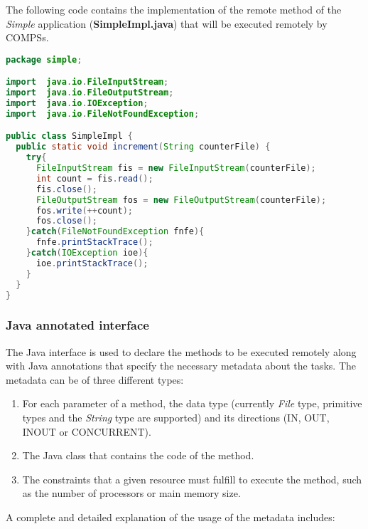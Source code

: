 The following code contains the implementation of the remote method of the {\it Simple} application ({\bf SimpleImpl.java})
that will be executed remotely by COMPSs.

\begin{lstlisting}[language=java]
package simple;

import  java.io.FileInputStream;
import  java.io.FileOutputStream;
import  java.io.IOException;
import  java.io.FileNotFoundException;

public class SimpleImpl {
  public static void increment(String counterFile) {
    try{
      FileInputStream fis = new FileInputStream(counterFile);
      int count = fis.read();
      fis.close();
      FileOutputStream fos = new FileOutputStream(counterFile);
      fos.write(++count);
      fos.close();
    }catch(FileNotFoundException fnfe){
      fnfe.printStackTrace();
    }catch(IOException ioe){
      ioe.printStackTrace();
    }
  }
}
\end{lstlisting}


\subsubsection{Java annotated interface}
The Java interface is used to declare the methods to be executed remotely along with Java annotations that
specify the necessary metadata about the tasks. The metadata can be of three different types:

\begin{enumerate}
 \item For each parameter of a method, the data type (currently {\it File} type, primitive types and the {\it String} type are supported) and its directions (IN, OUT, INOUT or CONCURRENT).
 \item The Java class that contains the code of the method.
 \item The constraints that a given resource must fulfill to execute the method, such as the number of processors or main memory size.
\end{enumerate}

A complete and detailed explanation of the usage of the metadata includes:

